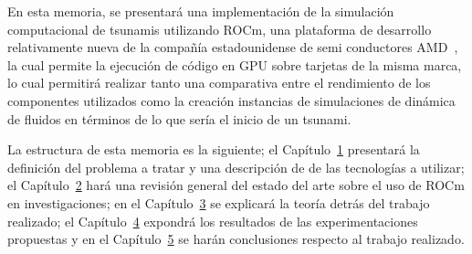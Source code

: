 En esta memoria, se presentará una implementación de la simulación computacional de tsunamis utilizando ROCm, una plataforma de desarrollo relativamente nueva de la compañía estadounidense de semi conductores AMD~\cite{rocm}, la cual permite la ejecución de código en GPU sobre tarjetas de la misma marca, lo cual permitirá realizar tanto una comparativa entre el rendimiento de los componentes utilizados como la creación instancias de simulaciones de dinámica de fluidos en términos de lo que sería el inicio de un tsunami. 

La estructura de esta memoria es la siguiente; el Capítulo~\hyperref[sec:1]{1} presentará la definición del problema a tratar y una descripción de de las tecnologías a utilizar; el Capítulo~\hyperref[sec:2]{2} hará una revisión general del estado del arte sobre el uso de ROCm en investigaciones; en el Capítulo~\hyperref[sec:3]{3} se explicará la teoría detrás del trabajo realizado; el Capítulo~\hyperref[sec:4]{4} expondrá los resultados de las experimentaciones propuestas y en el Capítulo~\hyperref[sec:5]{5} se harán conclusiones respecto al trabajo realizado.
